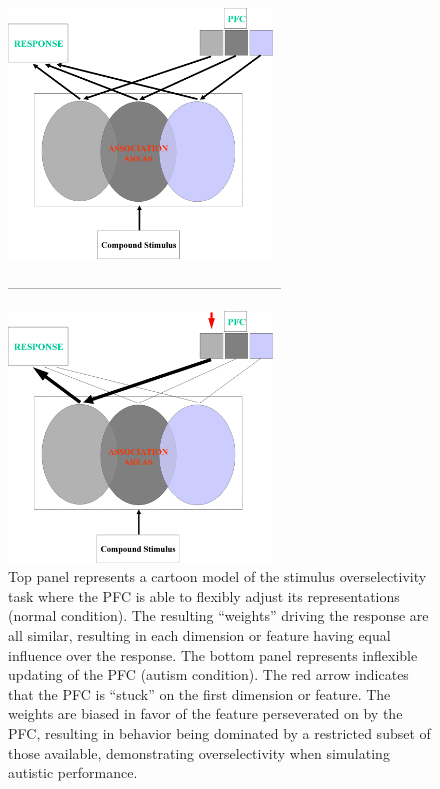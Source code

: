 \documentclass[man]{apa}
\begin{document}
\begin{figure}
\begin{center}
	\includegraphics[width=70mm]{figures/so_model_no_persev_new_2.eps}

-----------------------------------------------------------

	\includegraphics[width=70mm]{figures/so_model_d1_persev_new_2.eps}
\end{center}
\caption{Top panel represents a cartoon model of the stimulus overselectivity task where the PFC is able to flexibly adjust its representations (normal condition).  The resulting ``weights'' driving the response are all similar, resulting in each dimension or feature having equal influence over the response.  The bottom panel represents inflexible updating of the PFC (autism condition).  The red arrow indicates that the PFC is ``stuck'' on the first dimension or feature.  The weights are biased in favor of the feature perseverated on by the PFC, resulting in behavior being dominated by a restricted subset of those available, demonstrating overselectivity when simulating autistic performance.}
\label{OS-Model-Cartoon}
\end{figure} 

\end{document}

